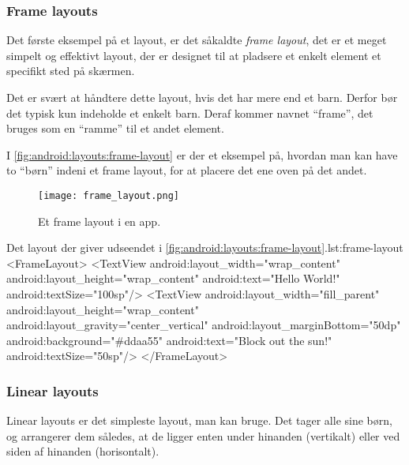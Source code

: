 \cleartoleftpage
\FloatBarrier

\subsubsection{Frame layouts}

Det første eksempel på et layout, er det såkaldte \textit{frame layout}, det er et meget simpelt og effektivt layout, der er designet til at pladsere et enkelt element et specifikt sted på skærmen.

Det er svært at håndtere dette layout, hvis det har mere end et barn. Derfor bør 
det typisk kun indeholde et enkelt barn. Deraf kommer navnet ``frame'', det 
bruges som en ``ramme'' til et andet element.

I \autoref{fig:android:layouts:frame-layout} er der et eksempel på, hvordan man 
kan have to ``børn'' indeni et frame layout, for at placere det ene oven på det 
andet.

\begin{figure}[!b]
	\begin{center}
		\texttt{[image: frame\_layout.png]}
		\caption{Et frame layout i en app.}
		\label{fig:android:layouts:frame-layout}
	\end{center}
\end{figure}


\begin{XmlCode}{Det layout der giver udseendet i \autoref{fig:android:layouts:frame-layout}.}{lst:frame-layout}
	<FrameLayout>
		<TextView
			android:layout_width="wrap_content"
			android:layout_height="wrap_content"
			android:text="Hello World!"
			android:textSize="100sp"/>
		<TextView
			android:layout_width="fill_parent"
			android:layout_height="wrap_content"
			android:layout_gravity="center_vertical"
			android:layout_marginBottom="50dp"
			android:background="#ddaa55"
			android:text="Block out the sun!"
			android:textSize="50sp"/>
	</FrameLayout>
\end{XmlCode}

\clearpage
\FloatBarrier

\subsubsection{Linear layouts}
Linear layouts er det simpleste layout, man kan bruge. Det tager alle sine 
børn, og arrangerer dem således, at de ligger enten under hinanden (vertikalt) 
eller ved siden af hinanden (horisontalt).

